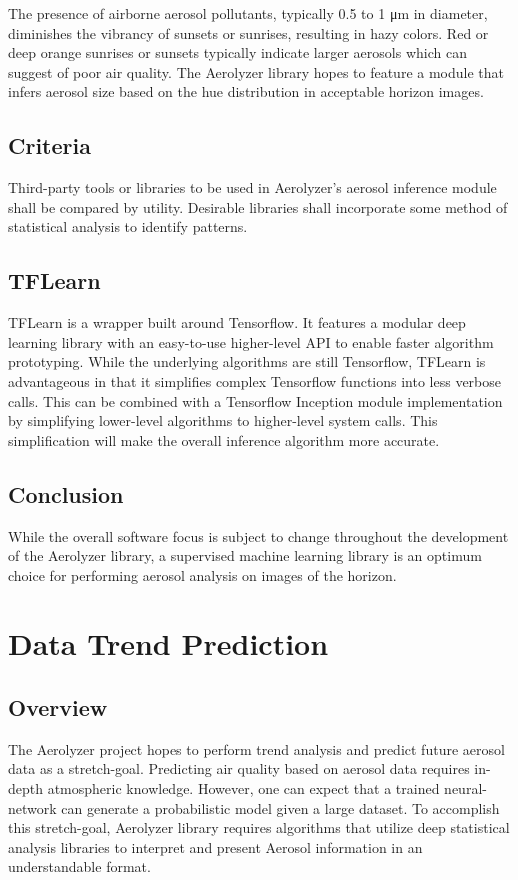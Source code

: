 \documentclass[onecolumn, draftclsnofoot,10pt, compsoc]{IEEEtran}
\begin{document}
\begin{singlespace}
		The presence of airborne aerosol pollutants, typically 0.5 to 1 μm in diameter, diminishes the vibrancy of sunsets or sunrises, resulting in hazy colors.
		Red or deep orange sunrises or sunsets typically indicate larger aerosols which can suggest of poor air quality. \cite{corfidi_2014}
		The Aerolyzer library hopes to feature a module that infers aerosol size based on the hue distribution in acceptable horizon images. 
		
	\subsection{Criteria}
		Third-party tools or libraries to be used in Aerolyzer's aerosol inference module shall be compared by utility.
		Desirable libraries shall incorporate some method of statistical analysis to identify patterns.

	\subsection{TFLearn}
		TFLearn is a wrapper built around Tensorflow.
		It features a modular deep learning library with an easy-to-use higher-level API to enable faster algorithm prototyping.
		While the underlying algorithms are still Tensorflow, TFLearn is advantageous in that it simplifies complex Tensorflow functions into less verbose calls.
		This can be combined with a Tensorflow Inception module implementation by simplifying lower-level algorithms to higher-level system calls.
		This simplification will make the overall inference algorithm more accurate. \cite{TFLearn}


	\subsection{Conclusion}
		While the overall software focus is subject to change throughout the development of the Aerolyzer library, a supervised machine learning library is an optimum choice for performing aerosol analysis on images of the horizon.


\section{Data Trend Prediction}
	\subsection{Overview}
		The Aerolyzer project hopes to perform trend analysis and predict future aerosol data as a stretch-goal.
		Predicting air quality based on aerosol data requires in-depth atmospheric knowledge.
		However, one can expect that a trained neural-network can generate a probabilistic model given a large dataset.
		To accomplish this stretch-goal, Aerolyzer library requires algorithms that utilize deep statistical analysis libraries to interpret and present Aerosol information in an understandable format.


\end{singlespace}
\end{document}
